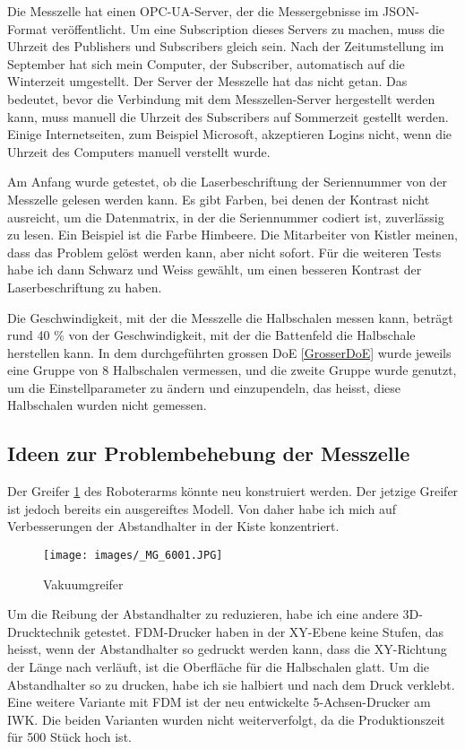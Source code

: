 Die Messzelle hat einen OPC-UA-Server, der die Messergebnisse im JSON-Format veröffentlicht. Um eine Subscription dieses Servers zu machen, muss die Uhrzeit des Publishers und Subscribers gleich sein. Nach der Zeitumstellung im September hat sich mein Computer, der Subscriber, automatisch auf die Winterzeit umgestellt. Der Server der Messzelle hat das nicht getan. Das bedeutet, bevor die Verbindung mit dem Messzellen-Server hergestellt werden kann, muss manuell die Uhrzeit des Subscribers auf Sommerzeit gestellt werden. Einige Internetseiten, zum Beispiel Microsoft, akzeptieren Logins nicht, wenn die Uhrzeit des Computers manuell verstellt wurde.


Am Anfang wurde getestet, ob die Laserbeschriftung der Seriennummer von der Messzelle gelesen werden kann. Es gibt Farben, bei denen der Kontrast nicht ausreicht, um die Datenmatrix, in der die Seriennummer codiert ist, zuverlässig zu lesen. Ein Beispiel ist die Farbe Himbeere. Die Mitarbeiter von Kistler meinen, dass das Problem gelöst werden kann, aber nicht sofort. Für die weiteren Tests habe ich dann Schwarz und Weiss gewählt, um einen besseren Kontrast der Laserbeschriftung zu haben.

Die Geschwindigkeit, mit der die Messzelle die Halbschalen messen kann, beträgt rund 40 \% von der Geschwindigkeit, mit der die Battenfeld die Halbschale herstellen kann. In dem durchgeführten grossen DoE \ref{GrosserDoE} wurde jeweils eine Gruppe von 8 Halbschalen vermessen, und die zweite Gruppe wurde genutzt, um die Einstellparameter zu ändern und einzupendeln, das heisst, diese Halbschalen wurden nicht gemessen.

\newpage
\subsection{Ideen zur Problembehebung der Messzelle}
Der Greifer \ref{fig:VakGrei} des Roboterarms könnte neu konstruiert werden. Der jetzige Greifer ist jedoch bereits ein ausgereiftes Modell. Von daher habe ich mich auf Verbesserungen der Abstandhalter in der Kiste konzentriert.
\begin{figure}%
   
  \texttt{[image: images/\_MG\_6001.JPG]}
  \caption{Vakuumgreifer}
  \label{fig:VakGrei}
\end{figure}

Um die Reibung der Abstandhalter zu reduzieren, habe ich eine andere 3D-Drucktechnik getestet. FDM-Drucker haben in der XY-Ebene keine Stufen, das heisst, wenn der Abstandhalter so gedruckt werden kann, dass die XY-Richtung der Länge nach verläuft, ist die Oberfläche für die Halbschalen glatt. Um die Abstandhalter so zu drucken, habe ich sie halbiert und nach dem Druck verklebt. Eine weitere Variante mit FDM ist der neu entwickelte 5-Achsen-Drucker am IWK. Die beiden Varianten wurden nicht weiterverfolgt, da die Produktionszeit für 500 Stück hoch ist.

